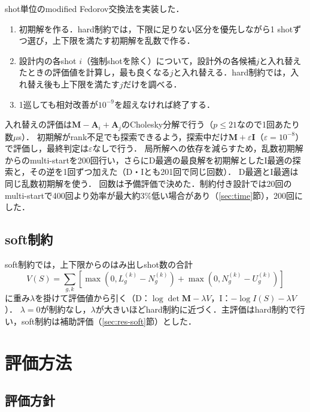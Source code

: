 \documentclass[10.5pt,a4paper]{ltjsarticle}
\begin{document}
shot単位のmodified Fedorov交換法\cite{cook1980}を実装した．
\begin{enumerate}
  \item 初期解を作る．hard制約では，下限に足りない区分を優先しながら1 shotずつ選び，上下限を満たす初期解を乱数で作る．
  \item 設計内の各shot $i$（強制shotを除く）について，設計外の各候補$j$と入れ替えたときの評価値を計算し，最も良くなる$j$と入れ替える．hard制約では，入れ替え後も上下限を満たす$j$だけを調べる．
  \item 1巡しても相対改善が$10^{-9}$を超えなければ終了する．
\end{enumerate}
入れ替えの評価は$\bm{M}-\bm{A}_i+\bm{A}_j$のCholesky分解で行う（$p\le21$なので1回あたり数$\mu$s）．
初期解がrank不足でも探索できるよう，探索中だけ$\bm{M}+\varepsilon\bm{I}$（$\varepsilon=10^{-8}$）で評価し，最終判定は$\varepsilon$なしで行う．
局所解への依存を減らすため，乱数初期解からのmulti-startを200回行い，さらにD最適の最良解を初期解としたI最適の探索と，その逆を1回ずつ加えた（D・Iとも201回で同じ回数）．
D最適とI最適は同じ乱数初期解を使う．
回数は予備評価で決めた．制約付き設計では20回のmulti-startで400回より効率が最大約3\%低い場合があり（\ref{sec:time}節），200回にした．

\subsection{soft制約}
\label{sec:soft}

soft制約では，上下限からのはみ出しshot数の合計
\begin{equation}
  V(S)=\sum_{g,k}\left[\max\!\left(0,L_g^{(k)}-N_g^{(k)}\right)+\max\!\left(0,N_g^{(k)}-U_g^{(k)}\right)\right]
\end{equation}
に重み$\lambda$を掛けて評価値から引く（D：$\log\det\bm{M}-\lambda V$，I：$-\log I(S)-\lambda V$）．
$\lambda=0$が制約なし，$\lambda$が大きいほどhard制約に近づく．主評価はhard制約で行い，soft制約は補助評価（\ref{sec:res-soft}節）とした．

\section{評価方法}

\subsection{評価方針}
\end{document}
